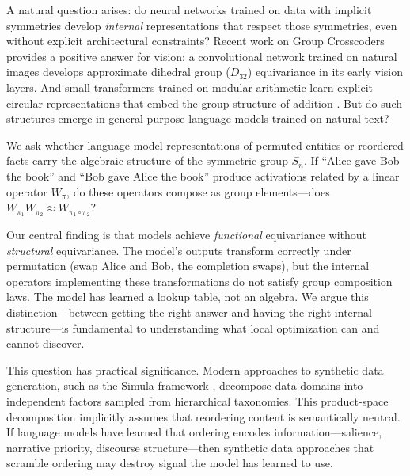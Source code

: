 \documentclass[10pt, letterpaper]{article}
\begin{document}
A natural question arises: do neural networks trained on data with implicit symmetries develop \emph{internal} representations that respect those symmetries, even without explicit architectural constraints? Recent work on Group Crosscoders \cite{bhaskar2024group} provides a positive answer for vision: a convolutional network trained on natural images develops approximate dihedral group ($D_{32}$) equivariance in its early vision layers. And small transformers trained on modular arithmetic learn explicit circular representations that embed the group structure of addition \cite{nanda2023grokking}. But do such structures emerge in general-purpose language models trained on natural text?

We ask whether language model representations of permuted entities or reordered facts carry the algebraic structure of the symmetric group $S_n$. If ``Alice gave Bob the book'' and ``Bob gave Alice the book'' produce activations related by a linear operator $W_\pi$, do these operators compose as group elements---does $W_{\pi_1} W_{\pi_2} \approx W_{\pi_1 \circ \pi_2}$?

Our central finding is that models achieve \emph{functional} equivariance without \emph{structural} equivariance. The model's outputs transform correctly under permutation (swap Alice and Bob, the completion swaps), but the internal operators implementing these transformations do not satisfy group composition laws. The model has learned a lookup table, not an algebra. We argue this distinction---between getting the right answer and having the right internal structure---is fundamental to understanding what local optimization can and cannot discover.

This question has practical significance. Modern approaches to synthetic data generation, such as the Simula framework \cite{davidson2026simula}, decompose data domains into independent factors sampled from hierarchical taxonomies. This product-space decomposition implicitly assumes that reordering content is semantically neutral. If language models have learned that ordering encodes information---salience, narrative priority, discourse structure---then synthetic data approaches that scramble ordering may destroy signal the model has learned to use.
\end{document}
